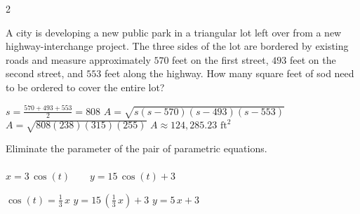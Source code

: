 \documentclass[11pt]{exam}
\begin{document}
\begin{questions}
\begin{multicols}{2}
\end{multicols}

\newpage

\question[3]
A city is developing a new public park in a triangular lot left over from a new highway-interchange project. The three sides of the lot are bordered by existing roads and measure approximately \(570\) feet on the first street, \(493\) feet on the second street, and \(553\) feet along the highway. How many square feet of sod need to be ordered to cover the entire lot?
\begin{solution}
    \(s = \frac{570 + 493 + 553}{2} = 808\)
    \(A = \sqrt{s(s-570)(s-493)(s-553)}\)
    \(A = \sqrt{808(238)(315)(255)}\)
    \(A \approx 124,285.23\text{ ft}^2\)
\end{solution}

\answerline

\question[3]
Eliminate the parameter of the pair of parametric equations.\\ \\
\(x = 3 \, \cos\left(t\right) \qquad y = 15 \, \cos\left(t\right) + 3\)
    \begin{solution}
        \(\cos\left(t\right) = \frac{1}{3} \, x\)
        \(y = 15 \, \left(\frac{1}{3} \, x\right) + 3\)
        \(y = 5 \, x + 3\)
    \end{solution}
\answerline

\newpage

\end{questions}
\end{document}
